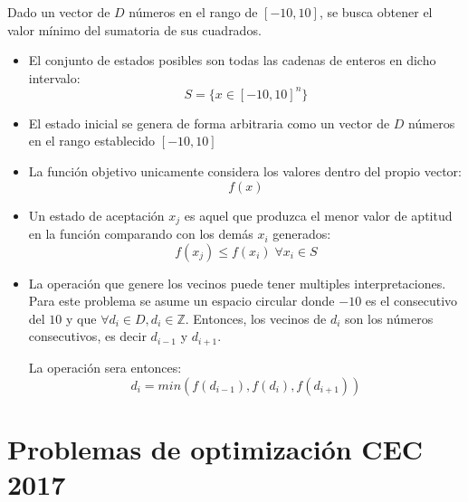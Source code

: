 Dado un vector de $D$ números en el rango de $[-10, 10]$, se busca obtener el valor mínimo del sumatoria  de sus cuadrados.

\begin{itemize}
	\item El conjunto de estados posibles son todas las cadenas de enteros en dicho intervalo: \[ S = \{ x \in [-10, 10]^n \} \]
	
	\item El estado inicial se genera de forma arbitraria como un vector de $D$ números en el rango establecido $[-10, 10]$
	
	\item La función objetivo unicamente considera los valores dentro del propio vector: \[f(x) \]
	
	\item Un estado de aceptación $x_j$ es aquel que produzca el menor valor de aptitud en la función comparando con los demás $x_i$ generados: \[ f(x_j) \leq f(x_i) \; \forall x_i \in S\] 
	
	\item La operación que genere los vecinos puede tener multiples interpretaciones. Para este problema se asume un espacio circular donde $-10$ es el consecutivo del $10$ y que $\forall d_i \in D, d_i \in \mathbb{Z}$.  Entonces, los vecinos de $d_i$ son los números consecutivos, es decir $d_{i-1}$ y $d_{i+1}$.
	
	La operación sera entonces:
	\[ d_i = min(f(d_{i-1}), f(d_i), f(d_{i+1})) \]	
\end{itemize}

\section{Problemas de optimización CEC 2017}

